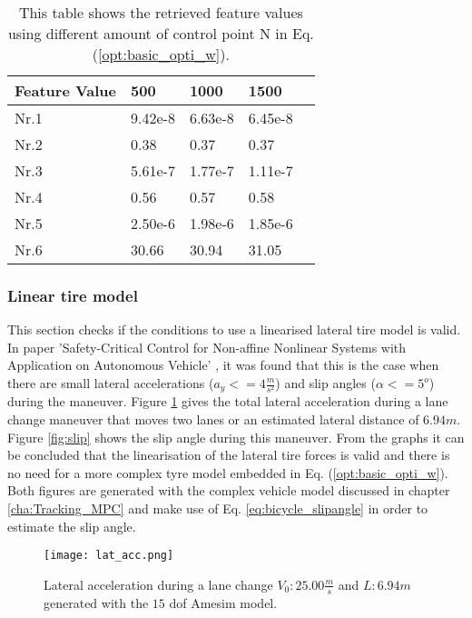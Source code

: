 \begin{table}[h!]
	\centering
	\begin{tabular}{@{}llllr@{}} \toprule
		\textbf{Feature Value}    & 500   & 1000       & 1500 \\ \midrule
		Nr.1       & 9.42e-8     & 6.63e-8   & 6.45e-8\\
		Nr.2       & 0.38        & 0.37      & 0.37\\
		Nr.3       & 5.61e-7     & 1.77e-7   & 1.11e-7 \\
		Nr.4       & 0.56        & 0.57      & 0.58\\
		Nr.5       & 2.50e-6     & 1.98e-6   & 1.85e-6\\
		Nr.6       & 30.66       & 30.94     & 31.05\\ \bottomrule
	\end{tabular}
	\caption{This table shows the retrieved feature values using different amount of control point N in Eq. (\ref{opt:basic_opti_w}).}
	\label{tab:GD_N}
\end{table}

\subsubsection{Linear tire model}
This section checks if the conditions to use a linearised lateral tire model is valid. In paper 'Safety-Critical Control for Non-affine Nonlinear Systems
with Application on Autonomous Vehicle' \cite{TongDuySon2019}, it was found that this is the case when there are small lateral accelerations ($a_y <= 4 \frac{m}{s^2}$) and slip angles ($\alpha <= 5^o $) during the maneuver. Figure \ref{fig:lat} gives the total lateral acceleration during a lane change maneuver that moves two lanes or an estimated lateral distance of $6.94 m$. Figure \ref{fig:slip} shows the slip angle during this maneuver. From the graphs it can be concluded that the linearisation of the lateral tire forces is valid and there is no need for a more complex tyre model embedded in Eq. (\ref{opt:basic_opti_w}).  Both figures are generated with the complex vehicle model discussed in chapter \ref{cha:Tracking_MPC} and make use of Eq. \ref{eq:bicycle_slipangle} in order to estimate the slip angle.

 \begin{figure}[h!]
	\centering
	\texttt{[image: lat\_acc.png]}
	\caption{Lateral acceleration during a lane change $V_0: 25.00 \frac{m}{s}$ and $L:6.94 m$ generated with the $15$ dof Amesim model.}
	\label{fig:lat}
\end{figure}

